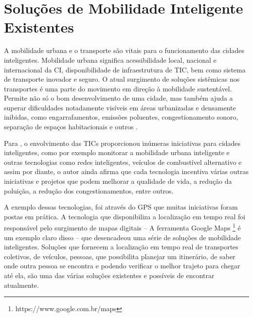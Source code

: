 %
%



\chapter{Soluções de Mobilidade Inteligente Existentes}\label{chap:Soluções Existentes} 
%



A mobilidade urbana e o transporte são vitais para o funcionamento das cidades inteligentes. Mobilidade urbana significa acessibilidade local, nacional e internacional da CI, disponibilidade de infraestrutura de TIC, bem como sistema de transporte inovador e seguro.  O atual surgimento de soluções sistêmicas nos transportes é uma parte do movimento em direção à mobilidade sustentável. Permite não só o bom desenvolvimento de uma cidade, mas também ajuda a superar dificuldades notadamente visíveis em áreas urbanizadas e densamente inibidas, como engarrafamentos, emissões poluentes, congestionamento sonoro, separação de espaços habitacionais e outros \cite{opitek}.

Para , o envolvimento das TICs proporcionou inúmeras iniciativas para cidades inteligentes, como por exemplo monitorar a mobilidade urbana inteligente e outras tecnologias como redes inteligentes, veículos de combustível alternativo e assim por diante, o autor ainda afirma que cada tecnologia incentiva várias outras iniciativas e projetos que podem melhorar a qualidade de vida, a redução da poluição, a redução dos congestionamentos, entre outros.

A exemplo dessas tecnologias, foi através do GPS que muitas iniciativas foram postas em prática. A tecnologia  que disponibiliza a localização em tempo real foi responsável pelo surgimento de mapas digitais -- A ferramenta Google Maps \footnote{https://www.google.com.br/maps} é um exemplo claro disso -- que desencadeou uma série de soluções de mobilidade inteligentes. Soluções que fornecem a localização em tempo real de transportes coletivos, de veículos, pessoas, que possibilita planejar um itinerário, de saber onde outra pessoa se encontra e podendo verificar o melhor trajeto para chegar até ela, são uma das várias soluções existentes e possíveis de encontrar atualmente.

